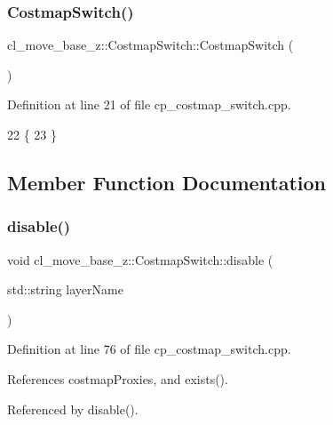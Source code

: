 \subsubsection{\texorpdfstring{Costmap\+Switch()}{CostmapSwitch()}}
{\footnotesize\ttfamily cl\+\_\+move\+\_\+base\+\_\+z\+::\+Costmap\+Switch\+::\+Costmap\+Switch (\begin{DoxyParamCaption}{ }\end{DoxyParamCaption})}



Definition at line 21 of file cp\+\_\+costmap\+\_\+switch.\+cpp.


\begin{DoxyCode}
22 \{
23 \}
\end{DoxyCode}


\subsection{Member Function Documentation}
\mbox{\label{classcl__move__base__z_1_1CostmapSwitch_af7cc8007da601736b445c051a6fbd49a}} 
\subsubsection{\texorpdfstring{disable()}{disable()}\hspace{0.1cm}{\footnotesize\ttfamily [1/2]}}
{\footnotesize\ttfamily void cl\+\_\+move\+\_\+base\+\_\+z\+::\+Costmap\+Switch\+::disable (\begin{DoxyParamCaption}\item[{std\+::string}]{layer\+Name }\end{DoxyParamCaption})}



Definition at line 76 of file cp\+\_\+costmap\+\_\+switch.\+cpp.



References costmap\+Proxies, and exists().



Referenced by disable().


